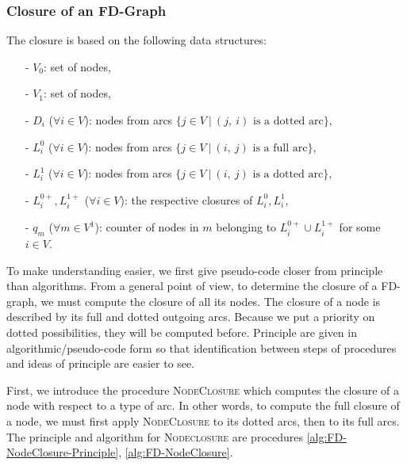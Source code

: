 \subsubsection{Closure of an FD-Graph}

The closure is based on the following data structures:
\begin{itemize}
	\item[-] $V_0$: set of  nodes,
	\item[-] $V_1$: set of  nodes,
	\item[-] $D_i$ ($\forall i \in V$): nodes from  arcs
	$\{j \in V \ | \ (j, \  i) \text{ is a dotted arc} \}$,
	\item[-] $L_{i}^0$ ($\forall i \in V$): nodes from  arcs
	$\{j \in V \ | \ (i, \  j) \text{ is a full arc} \}$,
	\item[-] $L_{i}^1$ ($\forall i \in V$): nodes from  	
	arcs $\{j \in V \ | \ (i, \  j) \text{ is a dotted arc} \}$,
	\item[-] $L_{i}^{0+}, L_{i}^{1+}$ ($\forall i \in V$): the respective closures
	of $L_i^0, L_i^1$,
	\item[-] $q_m$ ($\forall m \in V^1$): counter of nodes in $m$ belonging to 
	$L_i^{0+} \cup L_i^{1+}$ for some $i \in V$.
\end{itemize}

\noindent To make understanding easier, we first give pseudo-code closer from
principle than algorithms. From a general point of view, to determine the 
closure of a FD-graph, we must compute the closure of all its nodes. The 
closure of a node is described by its full and dotted outgoing arcs. Because we
put a priority on dotted possibilities, they will be computed before. Principle
are given in algorithmic/pseudo-code form so that identification between steps
of procedures and ideas of principle are easier to see.

\vspace{1.2em}

First, we introduce the procedure \textsc{NodeClosure} which computes the 
closure of a node with respect to a type of arc. In other words, to compute the 
full closure of a node, we must first apply \textsc{NodeClosure} to its dotted 
arcs, then to its full arcs. The principle and algorithm for 
\textsc{Nodeclosure} are procedures \ref{alg:FD-NodeClosure-Principle}, 
\ref{alg:FD-NodeClosure}. 

\vspace{1.2em}


